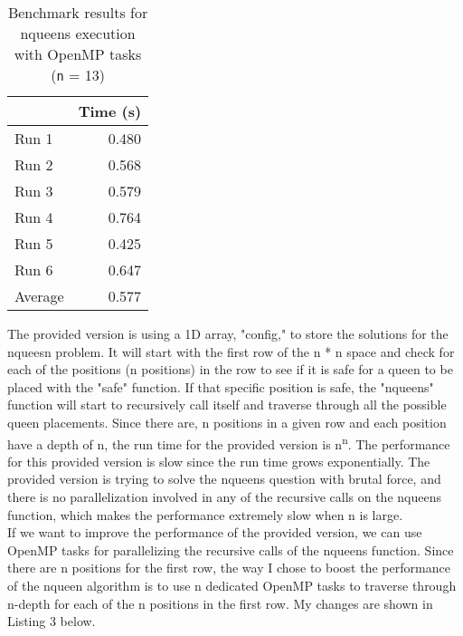 \documentclass[12pt]{article}
\begin{document}
\begin{table}[H]
  \centering
  \begin{tabular}{lr}
    & {\bf Time (s)} \\
    \hline
        Run 1 & 0.480 \\
    Run 2 & 0.568 \\
    Run 3 & 0.579 \\
    Run 4 & 0.764 \\
    Run 5 & 0.425 \\
    Run 6 & 0.647 \\
    \hline
    Average & 0.577 \\
  \end{tabular}
  \caption{Benchmark results for nqueens execution with OpenMP tasks ({\tt n} = 13)}
  \label{tbl-fib-tasks}
\end{table}


\newpage
\indent
The provided version is using a 1D array, "config," to store the solutions for the nqueesn problem. It will start with the first row of the n * n space and check for each of the positions (n positions) in the row to see if it is safe for a queen to be placed with the "safe" function. If that specific position is safe, the "nqueens" function will start to recursively call itself and traverse through all the possible queen placements. Since there are, n positions in a given row and each position have a depth of n, the run time for the provided version is n\textsuperscript{n}. The performance for this provided version is slow since the run time grows exponentially. The provided version is trying to solve the nqueens question with brutal force, and there is no parallelization involved in any of the recursive calls on the nqueens function, which makes the performance extremely slow when n is large. \\

\indent
 If we want to improve the performance of the provided version, we can use OpenMP tasks for parallelizing the recursive calls of the nqueens function. Since there are n positions for the first row, the way I chose to boost the performance of the nqueen algorithm is to use n dedicated OpenMP tasks to traverse through n-depth for each of the n positions in the first row. My changes are shown in Listing 3 below.
 
\end{document}
